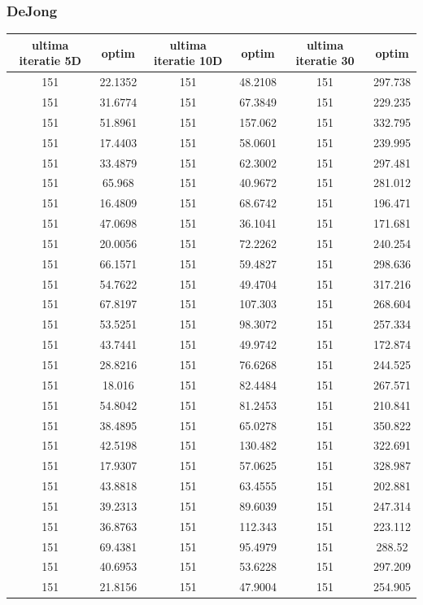 \documentclass{article}
\begin{document}
\subsubsection{DeJong}
\begin{tabular}{cccccc}
\hline
ultima iteratie 5D& optim&ultima iteratie 10D& optim&ultima iteratie 30&optim\\
\hline
151&22.1352&151&48.2108&151&297.738 \\ \hline
151&31.6774&151&67.3849&151&229.235 \\ \hline
151&51.8961&151&157.062&151&332.795 \\ \hline
151&17.4403&151&58.0601&151&239.995 \\ \hline
151&33.4879&151&62.3002&151&297.481 \\ \hline
151&65.968&151&40.9672&151&281.012 \\ \hline
151&16.4809&151&68.6742&151&196.471 \\ \hline
151&47.0698&151&36.1041&151&171.681 \\ \hline
151&20.0056&151&72.2262&151&240.254 \\ \hline
151&66.1571&151&59.4827&151&298.636 \\ \hline
151&54.7622&151&49.4704&151&317.216 \\ \hline
151&67.8197&151&107.303&151&268.604 \\ \hline
151&53.5251&151&98.3072&151&257.334 \\ \hline
151&43.7441&151&49.9742&151&172.874 \\ \hline
151&28.8216&151&76.6268&151&244.525 \\ \hline
151&18.016&151&82.4484&151&267.571 \\ \hline
151&54.8042&151&81.2453&151&210.841 \\ \hline
151&38.4895&151&65.0278&151&350.822 \\ \hline
151&42.5198&151&130.482&151&322.691 \\ \hline
151&17.9307&151&57.0625&151&328.987 \\ \hline
151&43.8818&151&63.4555&151&202.881 \\ \hline
151&39.2313&151&89.6039&151&247.314 \\ \hline
151&36.8763&151&112.343&151&223.112 \\ \hline
151&69.4381&151&95.4979&151&288.52 \\ \hline
151&40.6953&151&53.6228&151&297.209 \\ \hline
151&21.8156&151&47.9004&151&254.905 \\ \hline

\end{tabular}
\end{document}
